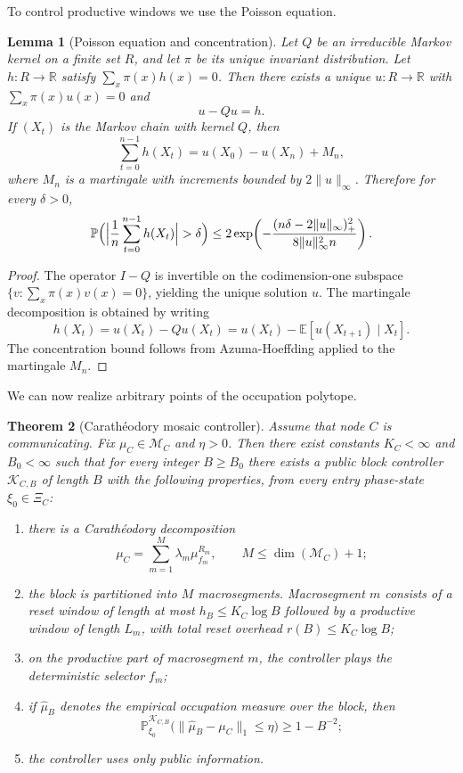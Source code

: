 \documentclass[12pt]{article}
\newtheorem{theorem}{Theorem}[section]
\newtheorem{lemma}[theorem]{Lemma}
\theoremstyle{definition}
\newcommand{\R}{\mathbb{R}}
\newcommand{\E}{\mathbb{E}}
\newcommand{\Pb}{\mathbb{P}}
\newcommand{\1}{\mathbf{1}}
\newcommand{\cK}{\mathcal{K}}
\newcommand{\cM}{\mathcal{M}}
\begin{document}
To control productive windows we use the Poisson equation.

\begin{lemma}[Poisson equation and concentration]
\label{lem:Poisson2}
Let \(Q\) be an irreducible Markov kernel on a finite set \(R\), and let \(\pi\) be its
unique invariant distribution.  Let \(h:R\to \R\) satisfy \(\sum_x \pi(x)h(x)=0\).  Then
there exists a unique \(u:R\to \R\) with \(\sum_x\pi(x)u(x)=0\) and
\[
u-Qu=h.
\]
If \((X_t)\) is the Markov chain with kernel \(Q\), then
\[
\sum_{t=0}^{n-1} h(X_t)=u(X_0)-u(X_n)+M_n,
\]
where \(M_n\) is a martingale with increments bounded by \(2\|u\|_\infty\).  Therefore
for every \(\delta>0\),
\[
\Pb\Bigl(\Bigl|\frac1n\sum_{t=0}^{n-1} h(X_t)\Bigr|>\delta\Bigr)
\le
2\exp\!\left(
-\frac{(n\delta-2\|u\|_\infty)_+^2}{8\|u\|_\infty^2 n}
\right).
\]
\end{lemma}

\begin{proof}
The operator \(I-Q\) is invertible on the codimension-one subspace
\(\{v:\sum_x \pi(x)v(x)=0\}\), yielding the unique solution \(u\).  The martingale
decomposition is obtained by writing
\[
h(X_t)=u(X_t)-Qu(X_t)
=u(X_t)-\E[u(X_{t+1})\mid X_t].
\]
The concentration bound follows from Azuma-Hoeffding applied to the martingale \(M_n\).
\end{proof}

We can now realize arbitrary points of the occupation polytope.

\begin{theorem}[Carath\'eodory mosaic controller]
\label{thm:mosaic}
Assume that node \(C\) is communicating.  Fix \(\mu_C\in \cM_C\) and \(\eta>0\).
Then there exist constants \(K_C<\infty\) and \(B_0<\infty\) such that for every integer
\(B\ge B_0\) there exists a public block controller \(\cK_{C,B}\) of length \(B\) with the
following properties, from every entry phase-state \(\xi_0\in \Xi_C\):
\begin{enumerate}[label=\textnormal{(\roman*)},leftmargin=2.6em]
\item there is a Carath\'eodory decomposition
\[
\mu_C=\sum_{m=1}^M \lambda_m \mu_{f_m}^{R_m},
\qquad
M\le \dim(\cM_C)+1;
\]
\item the block is partitioned into \(M\) macrosegments.  Macrosegment \(m\) consists of a
reset window of length at most \(h_B\le K_C\log B\) followed by a productive window of
length \(L_m\), with total reset overhead \(r(B)\le K_C\log B\);
\item on the productive part of macrosegment \(m\), the controller plays the deterministic
selector \(f_m\);
\item if \(\widehat\mu_B\) denotes the empirical occupation measure over the block, then
\[
\Pb_{\xi_0}^{\cK_{C,B}}\bigl(\|\widehat\mu_B-\mu_C\|_1\le \eta\bigr)\ge 1-B^{-2};
\]
\item the controller uses only public information.
\end{enumerate}
\end{theorem}
\end{document}
